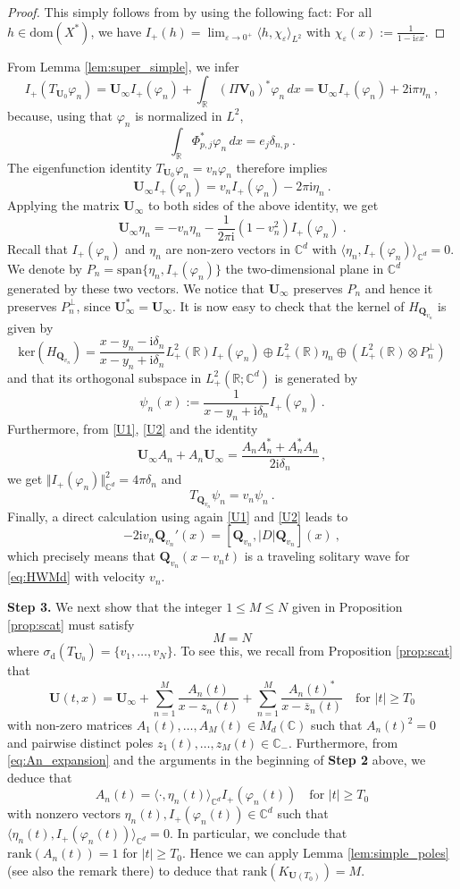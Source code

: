 \documentclass[11pt,reqno]{amsart}
\theoremstyle{definition}
\theoremstyle{remark}
\theoremstyle{remark}
\numberwithin{equation}{section}
\newcommand{\C}{\mathbb{C}}
\newcommand{\R}{\mathbb{R}}
\newcommand{\ov}{\overline}
\renewcommand{\ker}{\mathrm{ker}}
\newcommand{\dom}{\mathrm{dom}}
\newcommand{\rank}{\mathrm{rank}}
\newcommand{\Qv}{\mathbf{Q}}
\newcommand{\be}{\begin{equation}}
\newcommand{\ee}{\end{equation}}
\newcommand{\eps}{\varepsilon}
\newcommand{\ii}{\mathrm{i}}
\newcommand{\Vb}{\mathbf{V}}
\newcommand{\Ub}{\mathbf{U}}
\newcommand{\Ds}{|D|}
\renewcommand{\phi}{\varphi}
\begin{document}
\begin{proof} This simply follows from by using the following fact: For all $h \in \dom(X^*)$, we have
$I_+(h)=\lim_{\eps \to 0^+} \langle h, \chi_\eps \rangle _{L^2}$ with $\chi_\eps (x):=\frac{1}{1-\ii \eps x}$.
\end{proof}

From Lemma \ref{lem:super_simple}, we infer
$$I_+(T_{\Ub_0}\varphi_n)=\Ub_\infty I_+(\varphi_n)+\int_\R (\Pi \Vb_0)^* \varphi_n\, dx = \Ub_\infty I_+(\varphi_n)+2\ii \pi \eta_n\ ,$$
because, using that $\varphi_n$ is normalized in $L^2$, 
$$\int_\R \Phi_{p,j}^*\varphi_n \, dx = e_j \delta_{n,p}\ .$$
The eigenfunction identity $T_{\Ub_0} \varphi_n =v_n \varphi_n$ therefore implies
\be \label{U1}
\Ub_\infty I_+(\varphi_n)=v_n I_+(\varphi _n) -2\pi \ii \eta_n\ .
\ee
Applying the matrix $\Ub_\infty$ to both sides of the above identity, we get
\be \label{U2}
\Ub_\infty \eta_n =-v_n\eta _n -\frac{1}{2 \pi \ii}(1-v_n^2)I_+(\varphi_n)\ .
\ee
Recall that $I_+(\varphi_n)$ and $\eta _n$ are non-zero vectors in $\C^d$ with $\langle \eta_n, I_+(\phi_n) \rangle_{\C^d} = 0$. We denote by $P_n = \mathrm{span} \{ \eta_n, I_+(\phi_n) \}$  the two-dimensional plane in $\C^d$ generated by these two vectors. We notice that $\Ub_\infty$ preserves $P_n$ and hence it preserves $P_n^\perp $, since $\Ub_\infty ^*=\Ub_\infty $. It is now easy to check that the kernel of $H_{\Qv_{v_n}}$ is given by
$$\ker( H_{\Qv_{v_n}})= \frac{x-y_n-\ii\delta_n}{x-y_n+\ii\delta _n}L^2_+(\R )I_+(\varphi_n) \oplus L^2_+(\R )\eta_n \oplus (L^2_+(\R )\otimes P_n^\perp )$$
and that its orthogonal subspace  in $L^2_+(\R; \C^d)$ is generated by 
$$\psi _n(x):=\frac{1}{x-y_n+\ii \delta_n}I_+(\varphi_n)\ .$$
Furthermore, from  \eqref{U1}, \eqref{U2} and the identity 
$$\Ub_\infty A_n +A_n \Ub_\infty =\frac{A_nA_n^*+A_n^*A_n}{2\ii \delta _n} \, ,$$
we get $\Vert I_+(\varphi_n)\Vert_{\C^d}^2=4\pi \delta_n$ and 
$$T_{\Qv_{v_n}}\psi_n =v_n \psi_n\ .$$
Finally, a direct calculation using again \eqref{U1} and \eqref{U2} leads to 
$$-2\ii v_n\Qv_{v_n}'(x)=[\Qv_{v_n},\Ds \Qv_{v_n}](x)\ ,$$
which precisely means that $\Qv_{v_n} (x-v_nt)$ is a traveling solitary wave for \eqref{eq:HWMd} with velocity $v_n$.

\medskip
\textbf{Step 3.} We next show that the integer $1 \leq M \leq N$ given in Proposition \ref{prop:scat} must satisfy
$$
M=N 
$$
where  $\sigma_{\mathrm{d}}(T_{\Ub_0}) = \{v_1, \ldots, v_N\}$. To see this, we recall from Proposition \ref{prop:scat} that
$$
\Ub(t,x) = \Ub_\infty + \sum_{n=1}^M \frac{A_n(t)}{x-z_n(t)} + \sum_{n=1}^M \frac{A_n(t)^*}{x-\ov{z}_n(t)} \quad \mbox{for $|t| \geq T_0$} 
$$
with non-zero matrices $A_1(t), \ldots, A_M(t) \in M_d(\C)$ such that $A_n(t)^2 =0$ and pairwise distinct poles $z_1(t), \ldots, z_M(t) \in \C_-$. Furthermore, from \eqref{eq:An_expansion} and the arguments in the beginning of \textbf{Step 2} above, we deduce that
$$
A_n(t) = \langle \cdot, \eta_n(t) \rangle_{\C^d} I_+(\phi_n(t)) \quad \mbox{for $|t| \geq T_0$}
$$ 
with nonzero vectors $\eta_n(t),I_+(\phi_n(t)) \in \C^d$ such that $\langle \eta_n(t), I_+(\phi_n(t)) \rangle_{\C^d} = 0$. In particular, we conclude that $\rank(A_n(t)) = 1$ for $|t| \geq T_0$. Hence we can apply Lemma \ref{lem:simple_poles} (see also the remark there) to deduce that $\rank(K_{\Ub(T_0)}) = M$.
\end{document}
